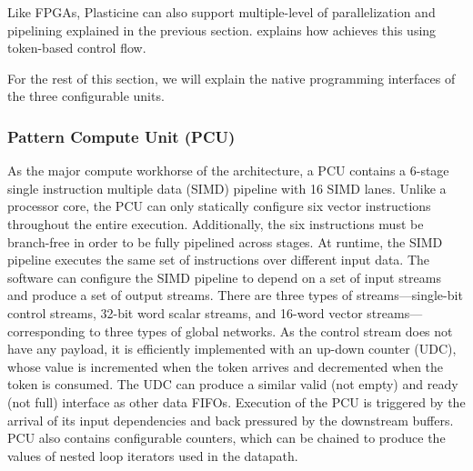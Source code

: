 Like FPGAs, Plasticine can also support multiple-level of parallelization and pipelining explained
in the previous section.  explains how \name achieves this using token-based
control flow.

For the rest of this section, we will explain the native programming interfaces of the three
configurable units.

\subsubsection{Pattern Compute Unit (PCU)}
As the major compute workhorse of the architecture, a PCU contains a 6-stage single instruction
multiple data (SIMD) pipeline with 16 SIMD lanes. 
Unlike a processor core, the PCU can only statically configure six vector instructions throughout the
entire execution.
Additionally, the six instructions must be branch-free in order to be fully pipelined across stages.
At runtime, the SIMD pipeline executes the same set of instructions over different input data.
The software can configure the SIMD pipeline to depend on a set of input streams and
produce a set of output streams. 
There are three types of streams---single-bit control streams, 32-bit word scalar streams, and
16-word vector streams---corresponding to three types of global networks.
As the control stream does not have any payload, it is efficiently implemented with an up-down counter
(UDC), whose value is incremented when the token arrives and decremented when the token is consumed. 
The UDC can produce a similar valid (not empty) and ready (not full) interface as other data FIFOs. 
Execution of the PCU is triggered by the arrival of its input dependencies and back pressured by
the downstream buffers.
PCU also contains configurable counters, which can be chained to produce the values of nested
loop iterators used in the datapath. 

